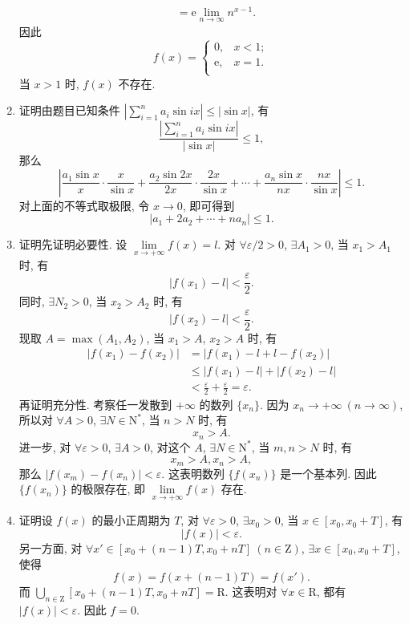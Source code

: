 \begin{enumerate}
\begin{align*}
                 &= \mathrm{e} \lim_{n\to\infty} n^{x-1}.
        \end{align*}
        因此
        \[
            f(x) =
                \begin{cases}
                    0, & x < 1; \\
                    \mathrm{e}, & x = 1. \\
                \end{cases}
        \]
        当 $x > 1$ 时, $f(x)$ 不存在.
    \item %
        {\heiti 证明}\quad 由题目已知条件 $\left|\sum\limits_{i=1}^n a_i\sin ix\right| \leqslant |\sin x|$, 有
        \[
            \frac{\left|\sum\limits_{i=1}^n a_i\sin ix\right|}{|\sin x|} \leqslant 1,   
        \]
        那么
        \[
            \left| \frac{a_1\sin x}{x}\cdot\frac{x}{\sin x} + \frac{a_2\sin2x}{2x}\cdot\frac{2x}{\sin x} + \cdots + \frac{a_n\sin x}{nx}\cdot\frac{nx}{\sin x} \right| \leqslant 1.
        \]
        对上面的不等式取极限, 令 $x \to 0$, 即可得到
        \[
            |a_1 + 2a_2 + \cdots + na_n| \leqslant 1.
        \]
    \item %
        {\heiti 证明}\quad 先证明必要性. 设 $\lim\limits_{x\to+\infty}f(x) = l$. 对 $\forall \varepsilon/2 > 0$, $\exists A_1 > 0$, 当 $x_1 > A_1$ 时, 有
        \[
            |f(x_1) - l| < \frac\varepsilon2.    
        \]
        同时, $\exists N_2 > 0$, 当 $x_2 > A_2$ 时, 有
        \[
            |f(x_2) - l| < \frac\varepsilon2.    
        \]
        现取 $A = \max(A_1, A_2)$, 当 $x_1 > A$, $x_2 > A$ 时, 有
        \begin{align*}
            |f(x_1) - f(x_2)| &= |f(x_1) - l + l - f(x_2)| \\
                              &\leqslant |f(x_1) - l| + |f(x_2) - l| \\
                              &< \frac\varepsilon2 + \frac\varepsilon2 = \varepsilon.
        \end{align*}
        再证明充分性. 考察任一发散到 $+\infty$ 的数列 $\{x_n\}$. 因为 $x_n\rightarrow+\infty\ (n\to\infty)$, 所以对 $\forall A > 0$, $\exists N \in \mathrm{N}^*$, 当 $n > N$ 时, 有
        \[
            x_n > A.    
        \]
        进一步, 对 $\forall \varepsilon > 0$, $\exists A > 0$, 对这个 $A$, $\exists N \in \mathrm{N}^*$, 当 $m, n > N$ 时, 有
        \[
            x_m > A, x_n > A,    
        \]
        那么 $|f(x_m) - f(x_n)| < \varepsilon$. 这表明数列 $\{f(x_n)\}$ 是一个基本列. 因此 $\{f(x_n)\}$ 的极限存在, 即 $\lim\limits_{x\to+\infty}f(x)$ 存在.
    \item %
        {\heiti 证明}\quad 设 $f(x)$ 的最小正周期为 $T$, 对 $\forall \varepsilon > 0$, $\exists x_0 > 0$, 当 $x \in [x_0, x_0 + T]$, 有
        \[
            |f(x)| < \varepsilon.    
        \]
        另一方面, 对 $\forall x' \in [x_0 + (n-1)T, x_0 + nT]\ (n \in \mathrm{Z})$, $\exists x \in [x_0, x_0 + T]$, 使得
        \[
            f(x) = f(x + (n-1)T) = f(x').    
        \]
        而 $\bigcup\limits_{n\in\mathrm{Z}}[x_0 + (n-1)T, x_0 + nT] = \mathrm{R}$. 这表明对 $\forall x \in \mathrm{R}$, 都有 $|f(x)| < \varepsilon$. 因此 $f = 0$.
\end{enumerate}

% 